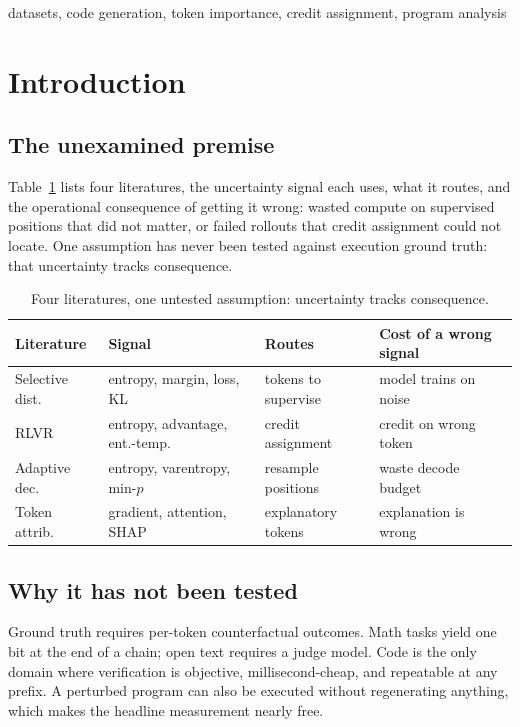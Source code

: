 \documentclass[twoside,11pt]{article}
\begin{document}
\begin{keywords}
  datasets, code generation, token importance, credit assignment, program analysis
\end{keywords}

\section{Introduction}

\subsection{The unexamined premise}

Table~\ref{tab:premise} lists four literatures, the uncertainty signal each uses, what it routes, and the operational consequence of getting it wrong: wasted compute on supervised positions that did not matter, or failed rollouts that credit assignment could not locate. One assumption has never been tested against execution ground truth: that uncertainty tracks consequence.

\begin{table}[h]
\centering
\small
\begin{tabular}{llll}
\toprule
Literature & Signal & Routes & Cost of a wrong signal \\
\midrule
Selective dist. & entropy, margin, loss, KL & tokens to supervise & model trains on noise \\
RLVR & entropy, advantage, ent.-temp. & credit assignment & credit on wrong token \\
Adaptive dec. & entropy, varentropy, min-$p$ & resample positions & waste decode budget \\
Token attrib. & gradient, attention, SHAP & explanatory tokens & explanation is wrong \\
\bottomrule
\end{tabular}
\caption{Four literatures, one untested assumption: uncertainty tracks consequence.}
\label{tab:premise}
\end{table}

\subsection{Why it has not been tested}

Ground truth requires per-token counterfactual outcomes. Math tasks yield one bit at the end of a chain; open text requires a judge model. Code is the only domain where verification is objective, millisecond-cheap, and repeatable at any prefix. A perturbed program can also be executed without regenerating anything, which makes the headline measurement nearly free.
\end{document}
